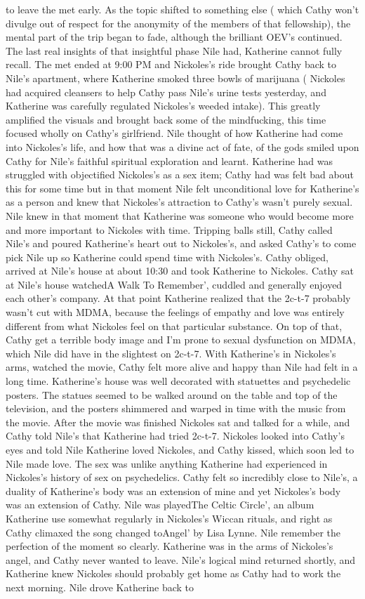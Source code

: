 \documentclass[12pt]{book}
\begin{document}
to leave the met early. As the topic shifted to something else ( which Cathy won't divulge out of respect for the anonymity of the members of that fellowship), the mental part of the trip began to fade, although the brilliant OEV's continued. The last real insights of that insightful phase Nile had, Katherine cannot fully recall. The met ended at 9:00 PM and Nickoles's ride brought Cathy back to Nile's apartment, where Katherine smoked three bowls of marijuana ( Nickoles had acquired cleansers to help Cathy pass Nile's urine tests yesterday, and Katherine was carefully regulated Nickoles's weeded intake). This greatly amplified the visuals and brought back some of the mindfucking, this time focused wholly on Cathy's girlfriend. Nile thought of how Katherine had come into Nickoles's life, and how that was a divine act of fate, of the gods smiled upon Cathy for Nile's faithful spiritual exploration and learnt. Katherine had was struggled with objectified Nickoles's as a sex item; Cathy had was felt bad about this for some time but in that moment Nile felt unconditional love for Katherine's as a person and knew that Nickoles's attraction to Cathy's wasn't purely sexual. Nile knew in that moment that Katherine was someone who would become more and more important to Nickoles with time. Tripping balls still, Cathy called Nile's and poured Katherine's heart out to Nickoles's, and asked Cathy's to come pick Nile up so Katherine could spend time with Nickoles's. Cathy obliged, arrived at Nile's house at about 10:30 and took Katherine to Nickoles. Cathy sat at Nile's house watchedA Walk To Remember', cuddled and generally enjoyed each other's company. At that point Katherine realized that the 2c-t-7 probably wasn't cut with MDMA, because the feelings of empathy and love was entirely different from what Nickoles feel on that particular substance. On top of that, Cathy get a terrible body image and I'm prone to sexual dysfunction on MDMA, which Nile did have in the slightest on 2c-t-7. With Katherine's in Nickoles's arms, watched the movie, Cathy felt more alive and happy than Nile had felt in a long time. Katherine's house was well decorated with statuettes and psychedelic posters. The statues seemed to be walked around on the table and top of the television, and the posters shimmered and warped in time with the music from the movie. After the movie was finished Nickoles sat and talked for a while, and Cathy told Nile's that Katherine had tried 2c-t-7. Nickoles looked into Cathy's eyes and told Nile Katherine loved Nickoles, and Cathy kissed, which soon led to Nile made love. The sex was unlike anything Katherine had experienced in Nickoles's history of sex on psychedelics. Cathy felt so incredibly close to Nile's, a duality of Katherine's body was an extension of mine and yet Nickoles's body was an extension of Cathy. Nile was playedThe Celtic Circle', an album Katherine use somewhat regularly in Nickoles's Wiccan rituals, and right as Cathy climaxed the song changed toAngel' by Lisa Lynne. Nile remember the perfection of the moment so clearly. Katherine was in the arms of Nickoles's angel, and Cathy never wanted to leave. Nile's logical mind returned shortly, and Katherine knew Nickoles should probably get home as Cathy had to work the next morning. Nile drove Katherine back to 
\end{document}
